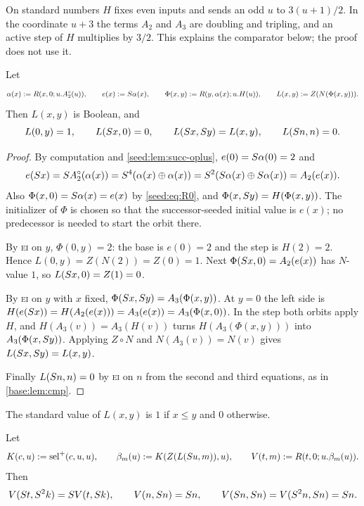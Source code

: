 On standard numbers $H$ fixes even inputs and sends an odd $u$ to
$3(u+1)/2$. In the coordinate $u+3$ the terms $A_2$ and $A_3$ are doubling
and tripling, and an active step of $H$ multiplies by $3/2$. This explains
the comparator below; the proof does not use it.

\begin{lemma}[A comparator]\label{seed:lem:succ-compare}
Let
\[
 \alpha(x)\mathrel{:=} R(x,0;u.A_2^{\circ}(u)),\qquad e(x)\mathrel{:=}S\alpha(x),
 \qquad \Phi(x,y)\mathrel{:=} R(y,\alpha(x);u.H(u)),\qquad
 L(x,y)\mathrel{:=} Z(N(\Phi(x,y))).
\]
Then $L(x,y)$ is Boolean, and
\[
 L(0,y)=1,\qquad L(S x,0)=0,\qquad L(S x,S y)=L(x,y),\qquad
 L(S n,n)=0 .
\]
\end{lemma}

\begin{proof}
By computation and \cref{seed:lem:succ-oplus}, $e(0)=S\alpha(0)=2$ and
\[
 e(S x)=S A_2^{\circ}(\alpha(x))=S^4(\alpha(x)\oplus\alpha(x))
 =S^2(S\alpha(x)\oplus S\alpha(x))=A_2(e(x)).
\]
Also $\Phi(x,0)=S\alpha(x)=e(x)$ by \eqref{seed:eq:R0}, and
$\Phi(x,S y)=H(\Phi(x,y))$. The initializer of $\Phi$ is chosen so that
the successor-seeded initial value is $e(x)$; no predecessor is needed to
start the orbit there.

By \textsc{ei} on $y$, $\Phi(0,y)=2$: the base is $e(0)=2$ and the step is
$H(2)=2$. Hence $L(0,y)=Z(N(2))=Z(0)=1$. Next
$\Phi(S x,0)=A_2(e(x))$ has $N$-value $1$, so $L(S x,0)=Z(1)=0$.

By \textsc{ei} on $y$ with $x$ fixed,
$\Phi(S x,S y)=A_3(\Phi(x,y))$. At $y=0$ the left side is
$H(e(S x))=H(A_2(e(x)))=A_3(e(x))=A_3(\Phi(x,0))$. In the step both
orbits apply $H$, and $H(A_3(v))=A_3(H(v))$ turns
$H(A_3(\Phi(x,y)))$ into $A_3(\Phi(x,S y))$. Applying $Z\circ N$ and
$N(A_3(v))=N(v)$ gives $L(S x,S y)=L(x,y)$.

Finally $L(S n,n)=0$ by \textsc{ei} on $n$ from the second and third
equations, as in \cref{base:lem:cmp}.
\end{proof}

The standard value of $L(x,y)$ is $1$ if $x\leq y$ and $0$ otherwise.

\begin{lemma}[Saturation]\label{seed:lem:succ-sat}
Let
\[
 K(c,u)\mathrel{:=}\operatorname{sel}^{+}(c,u,u),\qquad
 \beta_m(u)\mathrel{:=} K(Z(L(S u,m)),u),\qquad
 V(t,m)\mathrel{:=} R(t,0;u.\beta_m(u)).
\]
Then
\[
 V(S t,S^2k)=S V(t,S k),\qquad V(n,S n)=S n,\qquad
 V(S n,S n)=V(S^2n,S n)=S n .
\]
\end{lemma}

